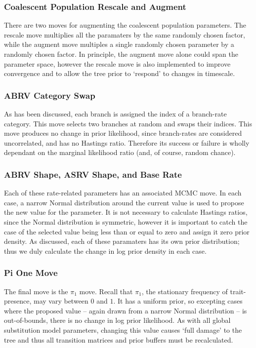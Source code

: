 \documentclass[10pt,journal,compsoc]{IEEEtran}
\begin{document}
\subsubsection{Coalescent Population Rescale and Augment}

There are two moves for augmenting the coalescent population parameters. The rescale move multiplies all the paramaters by the same randomly chosen factor, while the augment move multiples a single randomly chosen parameter by a randomly chosen factor. In principle, the augment move alone could span the parameter space, however the rescale move is also implemented to improve convergence and to allow the tree prior to `respond' to changes in timescale.

\subsubsection{ABRV Category Swap}

As has been discussed, each branch is assigned the index of a branch-rate category. This move selects two branches at random and swaps their indices. This move produces no change in prior likelihood, since branch-rates are considered uncorrelated, and has no Hastings ratio. Therefore its success or failure is wholly dependant on the marginal likelihood ratio (and, of course, random chance).

\subsubsection{ABRV Shape, ASRV Shape, and Base Rate}

Each of these rate-related parameters has an associated MCMC move. In each case, a narrow Normal distribution around the current value is used to propose the new value for the parameter. It is not necessary to calculate Hastings ratios, since the Normal distribution is symmetric, however it is important to catch the case of the selected value being less than or equal to zero and assign it zero prior density. As discussed, each of these paramaters has its own prior distribution; thus we duly calculate the change in log prior density in each case.

\subsubsection{Pi One Move}

The final move is the $\pi_1$ move. Recall that $\pi_1$, the stationary frequency of trait-presence, may vary between $0$ and $1$. It has a uniform prior, so excepting cases where the proposed value -- again drawn from a narrow Normal distribution -- is out-of-bounds, there is no change in log prior likelihood. As with all global substitution model parameters, changing this value causes `full damage' to the tree and thus all transition matrices and prior buffers must be recalculated.
\end{document}
